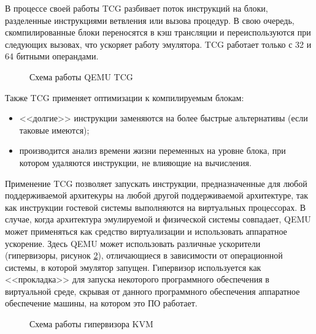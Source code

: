 В процессе своей работы TCG разбивает поток инструкций на блоки, разделенные инструкциями
ветвления или вызова процедур.
В свою очередь, скомпилированные блоки переносятся в кэш трансляции и переиспользуются при следующих
вызовах, что ускоряет работу эмулятора.
TCG работает только с 32 и 64 битными операндами.

\begin{figure}[!htbp]
    \centering
    
    \caption{Схема работы QEMU TCG}\label{fig:qemu-tcg}
\end{figure}

Также TCG применяет оптимизации к компилируемым блокам:
\begin{itemize}
    \item <<долгие>> инструкции заменяются на более быстрые альтернативы (если таковые имеются);
    \item производится анализ времени жизни переменных на уровне блока, при котором
          удаляются инструкции, не влияющие на вычисления.
\end{itemize}

Применение TCG позволяет запускать инструкции, предназначенные для любой поддерживаемой архитекуры
на любой другой поддерживаемой архитектуре, так как инструкции гостевой системы выполняются на виртуальных процессорах.
В случае, когда архитектура эмулируемой и физической системы совпадает, QEMU может применяться как средство виртуализации
и использовать аппаратное ускорение.
Здесь QEMU может использовать различные ускорители (гипервизоры, рисунок \ref{fig:kvm}),
отличающиеся в зависимости от операционной системы, в которой эмулятор запущен.
Гипервизор используется как <<прокладка>> для запуска некоторого программного обеспечения в виртуальной среде,
скрывая от данного программного обеспечения аппаратное обеспечение машины, на котором это ПО работает.

\begin{figure}[!htbp]
    \centering
    
    \caption{Схема работы гипервизора KVM}\label{fig:kvm}
\end{figure}
